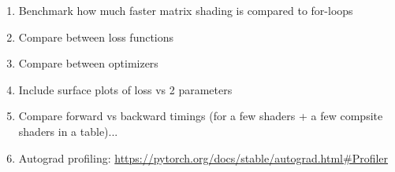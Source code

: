 \begin{enumerate}
    \item Benchmark how much faster matrix shading is compared to for-loops
    \item Compare between loss functions
    \item Compare between optimizers
    \item Include surface plots of loss vs 2 parameters
    \item Compare forward vs backward timings (for a few shaders + a few compsite shaders in a table)...
    \item Autograd profiling: \url{https://pytorch.org/docs/stable/autograd.html#Profiler}
\end{enumerate}
